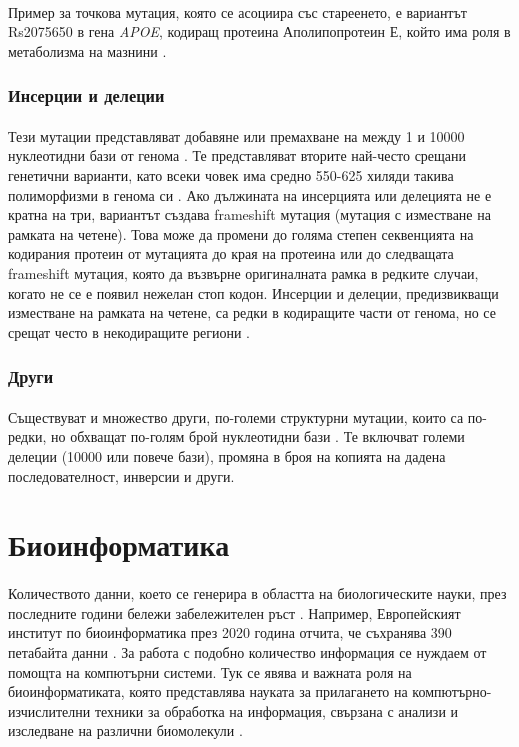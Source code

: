 \documentclass[pdftex,cyrillic,14pt,a4page,twoside,openright]{extreport}
\begin{document}
\paragraph{}
Пример за точкова мутация, която се асоциира със стареенето, е вариантът Rs2075650 в гена \textit{APOE}, кодиращ протеина Аполипопротеин Е, който има роля в метаболизма на мазнини \cite{deelen2011, lu2014}.

\subsubsection{Инсерции и делеции}
\paragraph{}
Тези мутации представляват добавяне или премахване на между 1 и 10000 нуклеотидни бази от генома \cite{mullaney2010}. Те представляват вторите най-често срещани генетични варианти, като всеки човек има средно 550-625 хиляди такива полиморфизми в генома си \cite{auton2015}. Ако дължината на инсерцията или делецията не е кратна на три, вариантът създава frameshift мутация (мутация с изместване на рамката на четене). Това може да промени до голяма степен секвенцията на кодирания протеин от мутацията до края на протеина или до следващата frameshift мутация, която да възвърне оригиналната рамка в редките случаи, когато не се е появил нежелан стоп кодон. Инсерции и делеции, предизвикващи изместване на рамката на четене, са редки в кодиращите части от генома, но се срещат често в некодиращите региони \cite{bai2013}.

\subsubsection{Други}
\paragraph{}
Съществуват и множество други, по-големи структурни мутации, които са по-редки, но обхващат по-голям брой нуклеотидни бази \cite{auton2015}. Те включват големи делеции (10000 или повече бази), промяна в броя на копията на дадена последователност, инверсии и други.

\section{Биоинформатика}
\paragraph{}
Количеството данни, което се генерира в областта на биологическите науки, през последните години бележи забележителен ръст \cite{marx2013}. Например, Европейският институт по биоинформатика през 2020 година отчита, че съхранява 390 петабайта данни \cite{embl2021}. За работа с подобно количество информация се нуждаем от помощта на компютърни системи. Тук се явява и важната роля на биоинформатиката, която представлява науката за прилагането на компютърно-изчислителни техники за обработка на информация, свързана с анализи и изследване на различни биомолекули \cite{luscombe2001}.
\end{document}
